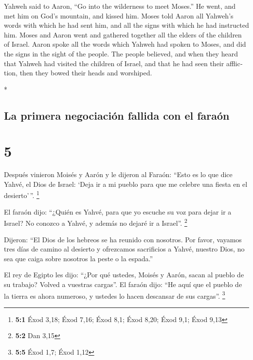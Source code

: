 \begin{paracol}{2}
\begin{otherlanguage}{english}
 Yahweh said to Aaron, ``Go into the wilderness to meet
Moses.'' He went, and met him on God's mountain, and kissed him.
 Moses told Aaron all Yahweh's words with which he had
sent him, and all the signs with which he had instructed him.
 Moses and Aaron went and gathered together all the
elders of the children of Israel.  Aaron spoke all the
words which Yahweh had spoken to Moses, and did the signs in the sight
of the people.  The people believed, and when they heard
that Yahweh had visited the children of Israel, and that he had seen
their affliction, then they bowed their heads and worshiped.

\end{otherlanguage}

\switchcolumn[0]*

\hypertarget{la-primera-negociaciuxf3n-fallida-con-el-farauxf3n}{%
\subsection{La primera negociación fallida con el
faraón}\label{la-primera-negociaciuxf3n-fallida-con-el-farauxf3n}}

\hypertarget{section-8}{%
\section{5}\label{section-8}}

 Después vinieron Moisés y Aarón y le dijeron al Faraón:
``Esto es lo que dice Yahvé, el Dios de Israel: `Deja ir a mi pueblo
para que me celebre una fiesta en el desierto'\,''. \footnote{\textbf{5:1}
  Éxod 3,18; Éxod 7,16; Éxod 8,1; Éxod 8,20; Éxod 9,1; Éxod 9,13}

 El faraón dijo: ``¿Quién es Yahvé, para que yo escuche su
voz para dejar ir a Israel? No conozco a Yahvé, y además no dejaré ir a
Israel''. \footnote{\textbf{5:2} Dan 3,15}

 Dijeron: ``El Dios de los hebreos se ha reunido con
nosotros. Por favor, vayamos tres días de camino al desierto y
ofrezcamos sacrificios a Yahvé, nuestro Dios, no sea que caiga sobre
nosotros la peste o la espada.''

 El rey de Egipto les dijo: ``¿Por qué ustedes, Moisés y
Aarón, sacan al pueblo de su trabajo? Volved a vuestras cargas''.
 El faraón dijo: ``He aquí que el pueblo de la tierra es
ahora numeroso, y ustedes lo hacen descansar de sus cargas''.
\footnote{\textbf{5:5} Éxod 1,7; Éxod 1,12}


\end{paracol}
